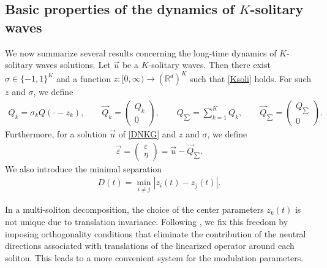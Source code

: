 \documentclass[reqno]{amsart}
\theoremstyle{plain}
\theoremstyle{definition}
\numberwithin{equation}{section}
\newcommand{\1}{\mathbbm{1}}
\begin{document}
\subsection{Basic properties of the dynamics of $K$-solitary waves}

We now summarize several results concerning the long-time dynamics of $K$-solitary waves solutions.
Let $\vec{u}$ be a $K$-solitary waves. Then there exist $\sigma\in\{-1,1\}^K$ and a function $z:[0,\infty)\to(\mathbb{R}^d)^K$ such that \eqref{Ksoli} holds.
For such $z$ and $\sigma$, we define
\begin{align*}
Q_k=\sigma_k Q(\cdot-z_k),\qquad
\vec{Q}_k=
\begin{pmatrix}
Q_k\\
0
\end{pmatrix},
\qquad
Q_{\sum}=\sum_{k=1}^KQ_k,\qquad
\vec{Q}_{\sum}=
\begin{pmatrix}
Q_{\sum}\\
0
\end{pmatrix}.
\end{align*}
Furthermore, for a solution $\vec{u}$ of \eqref{DNKG} and $z$ and $\sigma$, we define
\begin{align*}
\vec{\varepsilon}=
\begin{pmatrix}
\varepsilon\\
\eta
\end{pmatrix}
=\vec{u}-\vec{Q}_{\sum}.
\end{align*}
We also introduce the minimal separation
\begin{align*}
D(t)=\min_{i\neq j}|z_i(t)-z_j(t)|.
\end{align*}

In a multi-soliton decomposition, the choice of the center parameters $z_k(t)$ is not unique due to translation invariance.
Following \cite[Lemma 3.2]{I2}, we fix this freedom by imposing orthogonality conditions that eliminate the contribution of the
neutral directions associated with translations of the linearized operator around each soliton. This leads to a more
convenient system for the modulation parameters.
\end{document}
